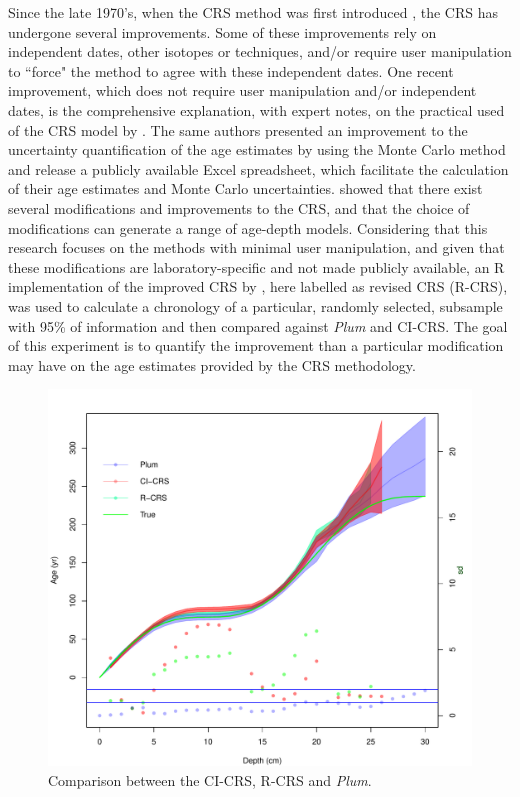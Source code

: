 \documentclass [10pt] {article}
\begin{document}
Since the late 1970's, when the CRS method was first introduced \citep{Appleby1978,Robbins1978}, the CRS has undergone several improvements. 
Some of these improvements rely on independent dates, other isotopes or techniques, and/or require user manipulation to ``force" the method to agree with these independent dates.
One recent improvement, which does not require user manipulation and/or independent dates, is the comprehensive explanation, with expert notes, on the practical used of the CRS model by \citet{Sanchez-Cabeza2012}. 
The same authors presented an improvement to the uncertainty quantification of the age estimates by using the Monte Carlo method \citep{Sanchez-Cabeza2014}
and release a publicly available Excel spreadsheet, which facilitate the calculation of their age estimates and Monte Carlo uncertainties. 
\citet{Barsanti2020} showed that there exist several modifications and improvements to the CRS, and that the choice of modifications can generate a range of age-depth models.
Considering that this research focuses on the methods with minimal user manipulation, and given that these modifications are laboratory-specific and not made publicly available, an R implementation of the improved CRS by \citet{Sanchez-Cabeza2014}, here labelled as revised CRS (R-CRS), was used to calculate a chronology of a particular, randomly selected, subsample with 95\% of information and then compared against \textit{Plum} and CI-CRS.
The goal of this experiment is to quantify the improvement than a particular modification may have on the age estimates provided by the CRS methodology.

\begin{figure}[h!]
 \centering
  \includegraphics[width=.95\linewidth]{95Comparison.pdf}
	\caption{Comparison between the CI-CRS, R-CRS and \textit{Plum}.} 
  \label{fig:95compa}
\end{figure}
\end{document}
